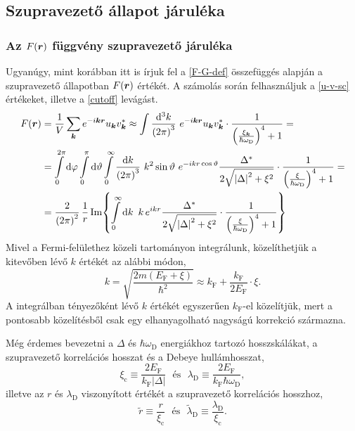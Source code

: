 \documentclass[a4paper,12pt,titlepage]{article}
\newcommand{\KK}{{\vb*{k}}}
\newcommand{\RR}{{\vb*{r}}}
\begin{document}
\subsection{Szupravezető állapot járuléka}

\subsubsection{Az $F(\RR)$ függvény szupravezető járuléka}

Ugyanúgy, mint korábban itt is írjuk fel a \eqref{F-G-def} összefüggés alapján a szupravezető állapotban $F(\RR)$ értékét.  A számolás során felhasználjuk a \eqref{u-v-sc} értékeket, illetve a \eqref{cutoff} levágást.
\begin{equation}
\begin{split}
	F(\RR) & = \frac{1}{V} \sum\limits_\KK e^{-i \KK \RR} u_\KK v_\KK^* \approx \int \frac{\dd[3]k}{\left( 2 \pi \right)^3} ~ e^{-i \KK \RR} u_\KK v_\KK^* \cdot \frac{1}{\left( \frac{\xi_\KK}{\hbar \omega_\text{D}} \right)^4 + 1} = \\
	& = \int\limits_0^{2 \pi} \dd{\varphi} \int\limits_0^\pi \dd{\vartheta} \int\limits_0^\infty \frac{\dd{k}}{\left( 2 \pi \right)^3} ~ k^2 \sin\vartheta ~ e^{-i k r \cos\vartheta} \frac{\Delta^*}{2 \sqrt{\left| \Delta \right|^2 + \xi^2}} \cdot \frac{1}{\left( \frac{\xi}{\hbar \omega_\text{D}} \right)^4 + 1} = \\
	& = \frac{2}{\left( 2 \pi \right)^2} \, \frac{1}{r} \Im{ \int\limits_0^\infty \dd{k} ~ k \, e^{i k r} \frac{\Delta^*}{2 \sqrt{\left| \Delta \right|^2 + \xi^2}} \cdot \frac{1}{\left( \frac{\xi}{\hbar \omega_\text{D}} \right)^4 + 1} }
\end{split}
\end{equation}
Mivel a Fermi-felülethez közeli tartományon integrálunk, közelíthetjük a kitevőben lévő $k$ értékét az alábbi módon,
\begin{equation}
	k = \sqrt{\frac{2 m \left( E_\text{F} + \xi \right)}{\hbar^2}} \approx k_\text{F} + \frac{k_\text{F}}{2 E_\text{F}} \cdot \xi.
\end{equation}
A integrálban tényezőként lévő $k$ értékét egyszerűen $k_\text{F}$-el közelítjük, mert a pontosabb közelítésből csak egy elhanyagolható nagyságú korrekció származna.

Még érdemes bevezetni a $\Delta$ és $\hbar \omega_\text{D}$ energiákhoz tartozó hosszskálákat, a szupravezető korrelációs hosszat és a Debeye hullámhosszat,
\begin{equation}
	\xi_\text{c} \equiv \frac{2 E_\text{F}}{k_\text{F} \left| \Delta \right|} ~~~ \text{és} ~~~ \lambda_\text{D} \equiv \frac{2 E_\text{F}}{k_\text{F} \hbar \omega_\text{D}},
\end{equation}
illetve az $r$ és $\lambda_\text{D}$ viszonyított értékét a szupravezető korrelációs hosszhoz,
\begin{equation}
	\tilde{r} \equiv \frac{r}{\xi_\text{c}} ~~~ \text{és} ~~~ \tilde{\lambda}_\text{D} \equiv \frac{\lambda_\text{D}}{\xi_\text{c}}.
\end{equation}
\end{document}
